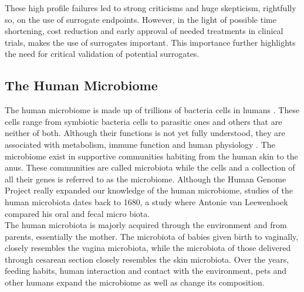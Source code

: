 \documentclass[a4paper,12pt]{article}
\begin{document}
	These high profile failures led to strong criticisms and huge skepticism, rightfully so, on the use of surrogate endpoints\citep{buyseM}. However, in the light of  possible time shortening, cost reduction and early approval of needed treatments in clinical trials, makes the use of surrogates important\citep{buyseM,surrogate2,surrogate3}. This importance further highlights the need for critical validation of potential surrogates.
	
	\subsection{The Human Microbiome}
	The human microbiome is made up of trillions of bacteria cells in humans \citep{ursell}. These cells range from symbiotic bacteria cells to parasitic ones and others that are neither of both\citep{ursell}. Although their functions is not yet fully understood, they are associated with metabolism, immune function and human physiology \citep{bull}. The microbiome exist in supportive communities habiting from the human skin to the anus\citep{microbiome101}. These communities are called microbiota while the cells and a collection of all their genes is referred to as the microbiome\citep{ursell,microbiome101}. Although the Human Genome Project\citep{humangenomeproject} really expanded our knowledge of the human microbiome, studies of the human microbiota dates back to 1680, a study where Antonie van Leewenhoek compared his oral and fecal micro biota\citep{ursell}.\\
	
	The human microbiota is majorly acquired through the environment and from parents, essentially the mother. The microbiota of babies given birth to vaginally, closely resembles the vagina microbiota, while the microbiota of those delivered through cesarean section closely resembles the skin microbiota\citep{ursell}. Over the years, feeding habits, human interaction and contact with the environment, pets and other humans expand the microbiome as well as change its composition\citep{ursell,microbiome101}.\\ 
	
\end{document}
